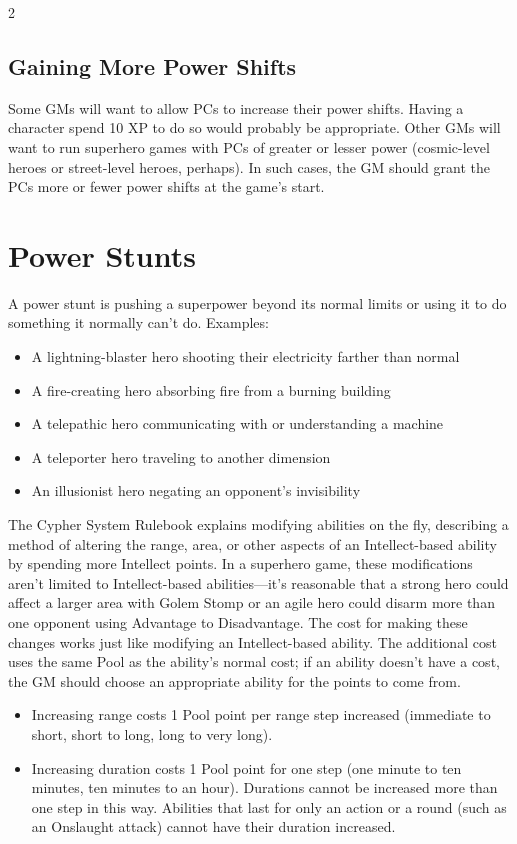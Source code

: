 \begin{multicols}{2}
\subsection{Gaining More Power Shifts}

Some GMs will want to allow PCs to increase their power shifts. Having a character spend 10 XP to do so would probably be appropriate. Other GMs will want to run superhero games with PCs of greater or lesser power (cosmic-level heroes or street-level heroes, perhaps). In such cases, the GM should grant the PCs more or fewer power shifts at the game’s start.

\section{Power Stunts}

A power stunt is pushing a superpower beyond its normal limits or using it to do something it normally can’t do. Examples:

\begin{itemize}
\item A lightning-blaster hero shooting their electricity farther than normal
\item A fire-creating hero absorbing fire from a burning building
\item A telepathic hero communicating with or understanding a machine
\item A teleporter hero traveling to another dimension
\item An illusionist hero negating an opponent’s invisibility
\end{itemize}

The Cypher System Rulebook explains modifying abilities on the fly, describing a method of altering the range, area, or other aspects of an Intellect-based ability by spending more Intellect points. In a superhero game, these modifications aren’t limited to Intellect-based abilities—it’s reasonable that a strong hero could affect a larger area with Golem Stomp or an agile hero could disarm more than one opponent using Advantage to Disadvantage. The cost for making these changes works just like modifying an Intellect-based ability. The additional cost uses the same Pool as the ability’s normal cost; if an ability doesn’t have a cost, the GM should choose an appropriate ability for the points to come from.

\begin{itemize}
\item Increasing range costs 1 Pool point per range step increased (immediate to short, short to long, long to very long).
\item Increasing duration costs 1 Pool point for one step (one minute to ten minutes, ten minutes to an hour). Durations cannot be increased more than one step in this way. Abilities that last for only an action or a round (such as an Onslaught attack) cannot have their duration increased.
\end{itemize}


\end{multicols}
